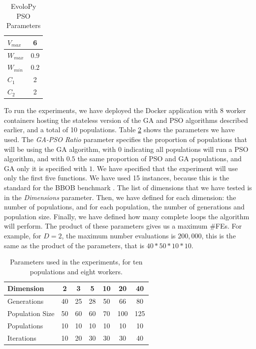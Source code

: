 \documentclass[runningheads]{llncs}
\begin{document}
\begin{table}
  \small
  \caption{ EvoloPy PSO Parameters }
  \label{tab:PSOparams} 
  \centering
  \small
  \begin{tabular}{|l|c|}
    \hline
    $V_{max}$ & 6 \\ \hline
    $W_{max}$ & $0.9$ \\ \hline
    $W_{min}$ & $0.2$ \\ \hline
    $C_1$ & 2 \\ \hline
    $C_2$ & 2 \\ \hline
  \end{tabular}
\end{table}

To run the experiments, we have deployed the Docker application with 8 worker
containers hosting the stateless version of the GA and PSO algorithms described
earlier, and a total of 10 populations. Table \ref{tab:params:10} shows the
parameters we have used. The {\em GA-PSO Ratio} parameter specifies the proportion 
of populations that will be using the GA algorithm, with $0$ indicating all populations
will run a PSO algorithm, and with $0.5$ the same proportion of PSO and GA populations, 
and GA only it is specified with $1$. We have specified that the experiment
will use only the first five functions. We have used 15 instances, because 
this is the standard for the BBOB benchmark \cite{hansen2016coco}.
The list of dimensions that we have tested is in the {\em Dimensions} parameter. 
Then, we have defined for each dimension: the number of populations, and for each population,
the number of generations and population size. Finally, we have defined how many complete loops the
algorithm will perform. The product of these parameters gives us a maximum
\#FEs. For example, for $D = 2$, the maximum number evaluations is $200,000$,
this is the same as the product of the parameters, that is $40*50*10*10$. 

\begin{table}[h!tb]
  \small
  \caption{Parameters used in the experiments, for ten populations and eight workers.
  }
  \label{tab:params:10}
  \vspace{0.25cm}
  \centering
  \small
  \begin{tabular}{|l|c|c|c|c|c|c|}
    \hline
    Dimension        & 2  & 3  & 5  & 10 & 20  & 40  \\ \hline
    Generations      & 40 & 25 & 28 & 50 & 66  & 80  \\ \hline
    Population Size  & 50 & 60 & 60 & 70 & 100 & 125 \\ \hline
    Populations      & 10 & 10 & 10 & 10 & 10  & 10  \\ \hline
    Iterations       & 10 & 20 & 30 & 30 & 30  & 40  \\ \hline  
  \end{tabular}
\end{table}
\end{document}

